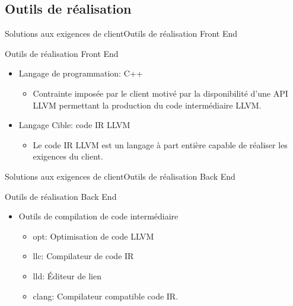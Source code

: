   \subsection{Outils de réalisation}
      \begin{frame}{Solutions aux exigences de client}{Outils de réalisation Front End}
        \begin{block}{Outils de réalisation Front End}
          \begin{itemize}
            \item<1-> Langage de programmation: C++
            \begin{itemize}
              \item<2-> Contrainte imposée par le client motivé par la disponibilité d'une API LLVM permettant la production du code intermédiaire LLVM.
            \end{itemize}
            \item<3-> Langage Cible: code IR LLVM
            \begin{itemize}
              \item<4-> Le code IR LLVM est un langage à part entière capable de réaliser les exigences du client. 
            \end{itemize}
          \end{itemize}
        \end{block}
      \end{frame}
    
      \begin{frame}{Solutions aux exigences de client}{Outils de réalisation Back End}
        \begin{block}{Outils de réalisation Back End}
          \begin{itemize}
            \item<1-> Outils de compilation de code intermédiaire
            \begin{itemize}
              \item<2-> opt: Optimisation de code LLVM
              \item<3-> llc: Compilateur de code IR
              \item<4-> lld: Éditeur de lien
              \item<5-> clang: Compilateur compatible code IR.
            \end{itemize}
            
          \end{itemize}
        \end{block}
      \end{frame}
